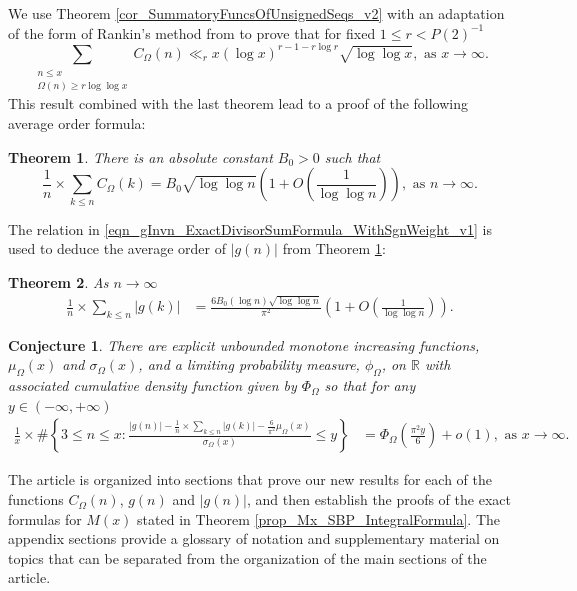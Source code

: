 \documentclass[11pt,reqno,a4letter]{article}
\newcommand{\hlocalref}[1]{\hyperref[#1]{\ref{#1}}}
\numberwithin{equation}{section}
\numberwithin{figure}{section}
\numberwithin{table}{section}
\theoremstyle{plain}
\newtheorem{theorem}{Theorem}
\numberwithin{theorem}{section}
\newtheorem*{conjecture*}{Conjecture}
\theoremstyle{definition}
\begin{document}
We use Theorem \hlocalref{cor_SummatoryFuncsOfUnsignedSeqs_v2} with 
an adaptation of the form of Rankin's method from \cite[Thm.~7.20]{MV} 
to prove that for fixed $1 \leq r < P(2)^{-1}$ 
\[
\sum_{\substack{n \leq x \\ \Omega(n) \geq r \log\log x}} C_{\Omega}(n) \ll_r 
     x (\log x)^{r-1-r\log r} \sqrt{\log\log x}, \text{ as } 
     x \rightarrow \infty. 
\]
This result combined with the last theorem lead to a proof of the following 
average order formula: 

\begin{theorem} 
\label{lemma_HatCAstxSum_ExactFormulaWithError_v1} 
There is an absolute constant $B_0 > 0$ such that 
\[
\frac{1}{n} \times \sum_{k \leq n} C_{\Omega}(k) = 
B_0 \sqrt{\log\log n}\left(1 + O\left(\frac{1}{\log\log n}\right)\right), 
     \text{ as } n \rightarrow \infty. 
\] 
\end{theorem} 

The relation in \eqref{eqn_gInvn_ExactDivisorSumFormula_WithSgnWeight_v1} 
is used to deduce the average order of $|g(n)|$ from 
Theorem \hlocalref{lemma_HatCAstxSum_ExactFormulaWithError_v1}: 

\begin{theorem} 
\label{cor_ExpectationFormulaAbsgInvn_v2} 
As $n \rightarrow \infty$ 
\begin{align*} 
\frac{1}{n} \times \sum_{k \leq n} |g(k)| & = 
     \frac{6B_0 (\log n) \sqrt{\log\log n}}{\pi^2} 
     \left(1 + O\left(\frac{1}{\log\log n}\right)\right). 
\end{align*} 
\end{theorem} 

\begin{conjecture*}
There are explicit unbounded monotone increasing functions, 
$\mu_{\Omega}(x)$ and $\sigma_{\Omega}(x)$, and 
a limiting probability measure, $\phi_{\Omega}$, on $\mathbb{R}$ with 
associated cumulative density function given by $\Phi_{\Omega}$ so that 
for any $y \in (-\infty, +\infty)$ 
\begin{align*} 
\frac{1}{x} \times \#\left\{3 \leq n \leq x: \frac{|g(n)| - 
	\frac{1}{n} \times \sum_{k \leq n} |g(k)| - \frac{6}{\pi^2} \mu_{\Omega}(x)}{\sigma_{\Omega}(x)}  
     \leq y\right\} & = 
     \Phi_{\Omega}\left(\frac{\pi^2 y}{6}\right) + o(1), \text{ as } x \rightarrow \infty. 
\end{align*}
\end{conjecture*}

The article is organized into sections that prove our new results for each of the functions 
$C_{\Omega}(n)$, $g(n)$ and $|g(n)|$, and then establish the proofs of the 
exact formulas for $M(x)$ stated in 
Theorem \hlocalref{prop_Mx_SBP_IntegralFormula}. 
The appendix sections provide a glossary of notation and 
supplementary material on topics that can be separated from the 
organization of the main sections of the article. 
\end{document}
